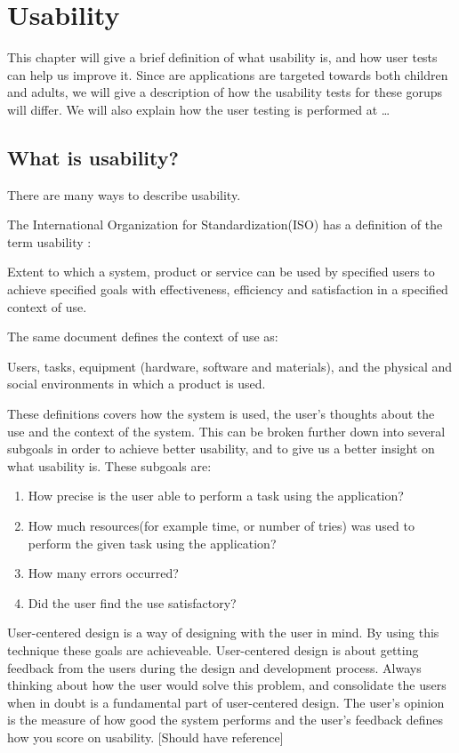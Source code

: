 \chapter{Usability}
\label{Usability}

This chapter will give a brief definition of what usability is, and how user tests can help us improve it. Since are applications are targeted towards both children and adults, we will give a description of how the usability tests for these gorups will differ. We will also explain how the user testing is performed at \ldots

\section{What is usability?}
There are many ways to describe usability. 

The International Organization for Standardization(ISO) has a definition of the term usability \cite{isousability}:

Extent to which a system, product or service can be used by specified
users to achieve specified goals with effectiveness, efficiency
and satisfaction in a specified context of use.

The same document defines the context of use as:

Users, tasks, equipment (hardware, software and materials), and
the physical and social environments in which a product is used.

These definitions covers how the system is used, the user's thoughts about the use and the context of the system. This can be broken further down into several subgoals in order to achieve better usability, and to give us a better insight on what usability is. 
These subgoals are:

\begin{enumerate}
\item{How precise is the user able to perform a task using the application?}
\item{How much resources(for example time, or number of tries) was used to perform the given task using the application?}
\item{How many errors occurred?}
\item{Did the user find the use satisfactory?}
\end{enumerate}

User-centered design is a way of designing with the user in mind. By using this technique these goals are achieveable. User-centered design is about getting feedback from the users during the design and development process. Always thinking about how the user would solve this problem, and consolidate the users when in doubt is a fundamental part of user-centered design. The user's opinion is the measure of how good the system performs and the user's feedback defines how you score on usability. [Should have reference]

